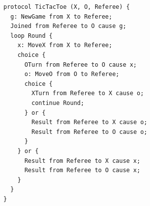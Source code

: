 \begin{lstlisting}[language={},basicstyle=\ttfamily\footnotesize,breaklines=true]
protocol TicTacToe (X, O, Referee) {
  g: NewGame from X to Referee;
  Joined from Referee to O cause g;
  loop Round {
    x: MoveX from X to Referee;
    choice {
      OTurn from Referee to O cause x;
      o: MoveO from O to Referee;
      choice {
        XTurn from Referee to X cause o;
        continue Round;
      } or {
        Result from Referee to X cause o;
        Result from Referee to O cause o;
      }
    } or {
      Result from Referee to X cause x;
      Result from Referee to O cause x;
    }
  }
}
\end{lstlisting}
